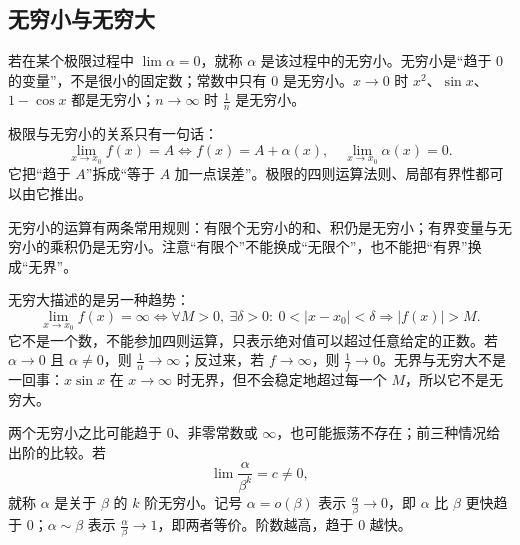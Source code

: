 \subsection{无穷小与无穷大}

若在某个极限过程中 $\lim\alpha=0$，就称 $\alpha$ 是该过程中的无穷小。无穷小是“趋于 $0$ 的变量”，不是很小的固定数；常数中只有 $0$ 是无穷小。$x\to0$ 时 $x^2$、$\sin x$、$1-\cos x$ 都是无穷小；$n\to\infty$ 时 $\frac1n$ 是无穷小。

极限与无穷小的关系只有一句话：
\[
    \lim_{x\to x_0}f(x)=A
    \iff
    f(x)=A+\alpha(x),\quad \lim_{x\to x_0}\alpha(x)=0.
\]
它把“趋于 $A$”拆成“等于 $A$ 加一点误差”。极限的四则运算法则、局部有界性都可以由它推出。

无穷小的运算有两条常用规则：有限个无穷小的和、积仍是无穷小；有界变量与无穷小的乘积仍是无穷小。注意“有限个”不能换成“无限个”，也不能把“有界”换成“无界”。

无穷大描述的是另一种趋势：
\[
    \lim_{x\to x_0}f(x)=\infty
    \iff
    \forall M>0,\ \exists\delta>0:\
    0<|x-x_0|<\delta\Rightarrow|f(x)|>M.
\]
它不是一个数，不能参加四则运算，只表示绝对值可以超过任意给定的正数。若 $\alpha\to0$ 且 $\alpha\ne0$，则 $\frac1\alpha\to\infty$；反过来，若 $f\to\infty$，则 $\frac1f\to0$。无界与无穷大不是一回事：$x\sin x$ 在 $x\to\infty$ 时无界，但不会稳定地超过每一个 $M$，所以它不是无穷大。

两个无穷小之比可能趋于 $0$、非零常数或 $\infty$，也可能振荡不存在；前三种情况给出阶的比较。若
\[
    \lim\frac{\alpha}{\beta^k}=c\ne0,
\]
就称 $\alpha$ 是关于 $\beta$ 的 $k$ 阶无穷小。记号 $\alpha=o(\beta)$ 表示 $\frac{\alpha}{\beta}\to0$，即 $\alpha$ 比 $\beta$ 更快趋于 $0$；$\alpha\sim\beta$ 表示 $\frac{\alpha}{\beta}\to1$，即两者等价。阶数越高，趋于 $0$ 越快。

